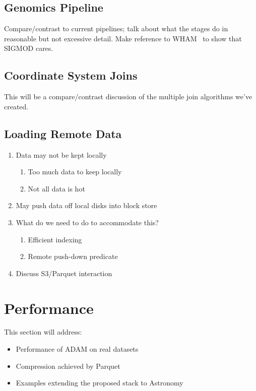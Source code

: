 \documentclass{acm_proc_article-sp}
\begin{document}
\subsection{Genomics Pipeline}
\label{sec:genomics-pipeline}

Compare/contrast to current pipelines; talk about what the stages do in reasonable but not
excessive detail. Make reference to WHAM~\cite{li11} to show that SIGMOD cares.

\subsection{Coordinate System Joins}
\label{sec:coordinate-system-joins}

This will be a compare/contrast discussion of the multiple join algorithms we've created.

\subsection{Loading Remote Data}
\label{sec:loading-remote-data}

\begin{enumerate}
\item Data may not be kept locally
\begin{enumerate}
\item Too much data to keep locally
\item Not all data is hot
\end{enumerate}
\item May push data off local disks into block store
\item What do we need to do to accommodate this?
\begin{enumerate}
\item Efficient indexing
\item Remote push-down predicate
\end{enumerate}
\item Discuss S3/Parquet interaction
\end{enumerate}

\section{Performance}
\label{sec:performance}

This section will address:

\begin{itemize}
\item Performance of ADAM on real datasets
\item Compression achieved by Parquet
\item Examples extending the proposed stack to Astronomy
\end{itemize}
\end{document}
